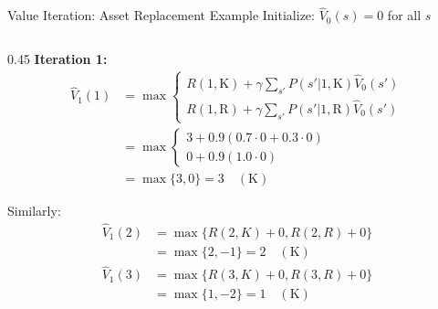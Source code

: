 \documentclass[10pt]{beamer}
\DeclareMathOperator*{\maxop}{max} %
\begin{document}
\begin{frame}{Value Iteration: Asset Replacement Example}
    Initialize: $\hat{V}_0(s) = 0$ for all $s$

    \begin{columns}[T] %
        \begin{column}{0.45\textwidth}
            \textbf{Iteration 1:} \small %
            \begin{align*}
                \hat{V}_1(1) &= \maxop \begin{cases}
                    R(1,\text{K}) + \gamma \sum_{s'} P(s'|1,\text{K})\hat{V}_0(s') \\
                    R(1,\text{R}) + \gamma \sum_{s'} P(s'|1,\text{R})\hat{V}_0(s')
                \end{cases} \\
                &= \maxop \begin{cases}
                    3 + 0.9(0.7 \cdot 0 + 0.3 \cdot 0) \\
                    0 + 0.9(1.0 \cdot 0)
                \end{cases} \\
                &= \maxop \{3, 0\} = 3 \quad (\text{K})
            \end{align*}

            Similarly: \small %
            \begin{align*}
                \hat{V}_1(2) &= \maxop \{R(2,K)+0, R(2,R)+0 \} \\
                           &= \maxop \{2, -1\} = 2 \quad (\text{K}) \\
                \hat{V}_1(3) &= \maxop \{R(3,K)+0, R(3,R)+0 \} \\
                           &= \maxop \{1, -2\} = 1 \quad (\text{K})
            \end{align*}
        \end{column}


\end{columns}
\end{frame}
\end{document}
